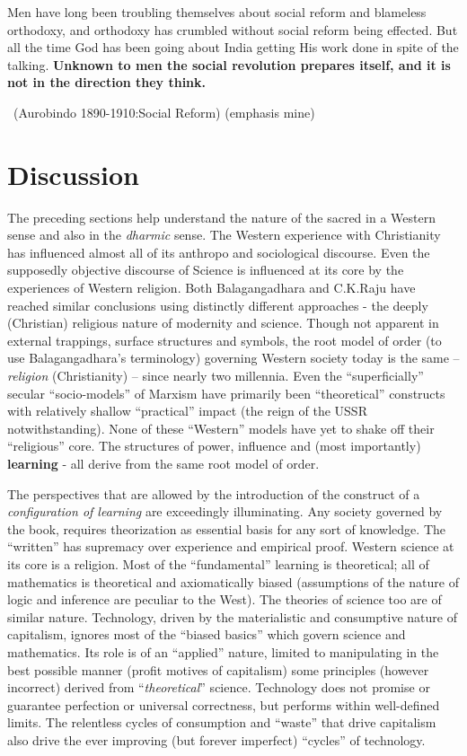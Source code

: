 \begin{myquote}
Men have long been troubling themselves about social reform and blameless orthodoxy, and orthodoxy has crumbled without social reform being effected. But all the time God has been going about India getting His work done in spite of the talking. \textbf{Unknown to men the social revolution prepares itself, and it is not in the direction they think.} 

~\hfill (Aurobindo 1890-1910:Social Reform) (emphasis mine)
\end{myquote}


\section*{Discussion}

\vskip -7pt

The preceding sections help understand the nature of the sacred in a Western sense and also in the \textit{dharmic} sense. The Western experience with Christianity has influenced almost all of its anthropo and sociological discourse. Even the supposedly objective discourse of Science is influenced at its core by the experiences of Western religion. Both Balagangadhara and C.K.Raju have reached similar conclusions using distinctly different approaches - the deeply (Christian) religious nature of modernity and science. Though not apparent in external trappings, surface structures and symbols, the root model of order (to use Balagangadhara's terminology) governing Western society today is the same – \textit{religion} (Christianity) – since nearly two millennia. Even the “superficially” secular “socio-models” of Marxism have primarily been “theoretical” constructs with relatively shallow “practical” impact (the reign of the USSR notwithstanding). None of these “Western” models have yet to shake off their “religious” core. The structures of power, influence and (most importantly) \textbf{learning} - all derive from the same root model of order.

The perspectives that are allowed by the introduction of the construct of a \textit{configuration of learning} are exceedingly illuminating. Any society governed by the book, requires theorization as essential basis for any sort of knowledge. The “written” has supremacy over experience and empirical proof. Western science at its core is a religion. Most of the “fundamental” learning is theoretical; all of mathematics is theoretical and axiomatically biased (assumptions of the nature of logic and inference are peculiar to the West). The theories of science too are of similar nature. Technology, driven by the materialistic and consumptive nature of capitalism, ignores most of the “biased basics” which govern science and mathematics. Its role is of an “applied” nature, limited to manipulating in the best possible manner (profit motives of capitalism) some principles (however incorrect) derived from “\textit{theoretical}” science. Technology does not promise or guarantee perfection or universal correctness, but performs within well-defined limits. The relentless cycles of consumption and “waste” that drive capitalism also drive the ever improving (but forever imperfect) “cycles” of technology. 

